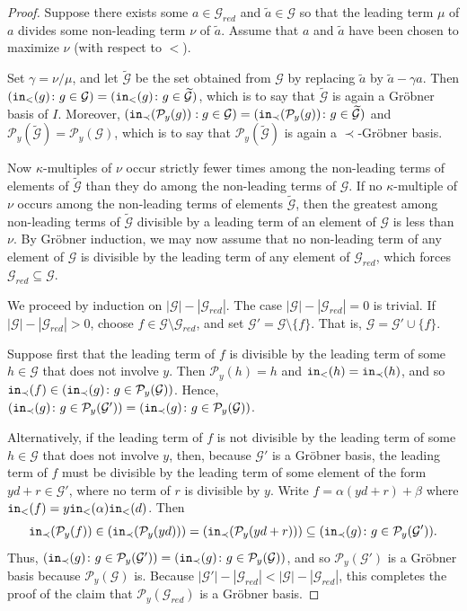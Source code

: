 \documentclass[12pt, reqno]{amsart}
\numberwithin{equation}{section}
\newtheorem{Main Conjecture}[theorem]{Main Conjecture}
\theoremstyle{definition}
\theoremstyle{plain}
\newcommand{\init}{{\tt in}}
\newcommand{\G}{\mathcal{G}}
\renewcommand{\P}{\mathcal{P}}
\begin{document}
\begin{proof}
    Suppose there exists some $a \in \G_{red}$ and $\tilde{a} \in \G$ so that the leading term $\mu$ of $a$ divides some non-leading term $\nu$ of $\tilde{a}$. Assume that $a$ and $\tilde{a}$ have been chosen to maximize $\nu$ (with respect to $<$). 
    
    Set $\gamma = \nu/\mu$, and let $\widetilde{\G}$ be the set obtained from $\G$ by replacing $\tilde{a}$ by $\tilde{a}-\gamma a$.  Then $(\init_< (g) \colon g \in \G) = (\init_< (g) \colon g \in \widetilde{\G})$, which is to say that $\widetilde{\G}$ is again a Gr\"obner basis of $I$.  Moreover, $(\init_\prec(\P_y(g)): g \in \G) = (\init_\prec(\P_y(g)) \colon g \in \widetilde{\G})$ and $\P_y(\widetilde{\G}) = \P_y(\G)$, which is to say that $\P_y(\widetilde{\G})$ is again a $\prec$-Gr\"obner basis.  
    
    Now $\kappa$-multiples of $\nu$ occur strictly fewer times among the non-leading terms of elements of $\widetilde{\G}$ than they do among the non-leading terms of $\G$. If no $\kappa$-multiple of $\nu$ occurs among the non-leading terms of elements $\widetilde{\G}$, then the greatest among non-leading terms of $\widetilde{\G}$ divisible by a leading term of an element of $\G$ is less than $\nu$.  By Gr\"obner induction, we may now assume that no non-leading term of any element of $\G$ is divisible by the leading term of any element of $\G_{red}$, which forces $\G_{red} \subseteq \G$.

    We proceed by induction on $|\G|-|\G_{red}|$.  The case $|\G|-|\G_{red}|=0$ is trivial.  If $|\G|-|\G_{red}|>0$, choose $f \in \G \setminus \G_{red}$, and set $\G' = \G \setminus \{f\}$.  That is, $\G=\G' \cup \{f\}$.  
    
  Suppose first that the leading term of $f$ is divisible by the leading term of some $h \in \G$ that does not involve $y$.  Then $\P_y(h) = h$ and $\init_<(h) = \init_\prec(h)$, and so $\init_\prec(f) \in (\init_\prec(g) \colon g \in \P_y(\G))$.  Hence, $(\init_\prec(g) \colon g \in \P_y(\G')) = (\init_\prec(g) \colon g \in \P_y(\G))$.
    
    Alternatively, if the leading term of $f$ is not divisible by the leading term of some $h \in \G$ that does not involve $y$, then, because $\G'$ is a Gr\"obner basis, the leading term of $f$ must be divisible by the leading term of some element of the form $yd+r \in \G'$, where no term of $r$ is divisible by $y$.  Write $f = \alpha(yd+r)+\beta$ where $\init_<(f) = y \init_<(\alpha)\init_<(d)$. Then \[
    \init_{\prec}(\P_y(f)) \in (\init_{\prec}(\P_y(yd))) = (\init_{\prec}(\P_y(yd+r))) \subseteq (\init_{\prec}(g) \colon g \in \P_y(\G')).
    \] Thus, $(\init_\prec(g) \colon g \in \P_y(\G')) = (\init_\prec(g) \colon g \in \P_y(\G))$, and so $\P_y(\G')$ is a Gr\"obner basis because $\P_y(\G)$ is.  Because $|\G'|-|\G_{red}| < |\G|-|\G_{red}|$, this completes the proof  of the claim that $\P_y(\G_{red})$ is a Gr\"obner basis.


\end{proof}
\end{document}
